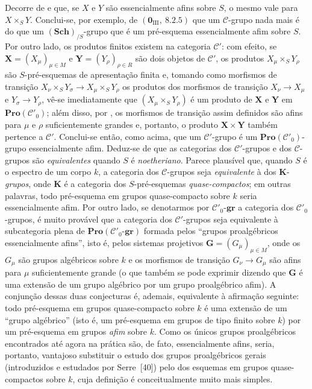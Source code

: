 \begin{remark}[8.13.6]
\label{IV.8.13.6}
Decorre de  e  que, se $X$ e $Y$ são essencialmente afins sobre $S$, o mesmo vale para $X\times_S Y$.
Conclui-se, por exemplo, de $(\mathbf{0}_{\text{III}},~8.2.5)$ que um $\mathcal{C}$-grupo nada mais é do que um $(\mathbf{Sch})_{/S}$-grupo que é um pré-esquema essencialmente afim sobre $S$.
Por outro lado, os produtos finitos existem na categoria $\mathcal{C}'$: com efeito, se $\mathbf{X}=(X_\mu)_{\mu\in M}$ e $\mathbf{Y}=(Y_\rho)_{\rho\in R}$ são dois objetos de $\mathcal{C}'$, os produtos $X_\mu\times_S Y_\rho$ são $S$-pré-esquemas de apresentação finita e, tomando como morfismos de transição $X_\nu\times_S Y_\sigma\to X_\mu\times_S Y_\rho$ os produtos dos morfismos de transição $X_\nu\to X_\mu$ e $Y_\sigma\to Y_\rho$, vê-se imediatamente que $(X_\mu\times_S Y_\rho)$ é um produto de $\mathbf{X}$ e $\mathbf{Y}$ em $\mathbf{Pro}(\mathcal{C}'_0)$; além disso, por , os morfismos de transição assim definidos são afins para $\mu$ e $\rho$ suficientemente grandes e, portanto, o produto $\mathbf{X}\times\mathbf{Y}$ também pertence a $\mathcal{C}'$.
Conclui-se então, como acima, que um $\mathcal{C}'$-grupo é um $\mathbf{Pro}(\mathcal{C}'_0)$-grupo essencialmente afim.
Deduz-se de  que as categorias dos $\mathcal{C}'$-grupos e dos $\mathcal{C}$-grupos são \emph{equivalentes} quando $S$ é \emph{noetheriano}.
Parece plausível que, quando $S$ é o espectro de um corpo $k$, a categoria dos $\mathcal{C}$-grupos seja \emph{equivalente} à dos $\boldsymbol{K}$-\emph{grupos}, onde $\boldsymbol{K}$ é a categoria dos $S$-pré-esquemas \emph{quase-compactos}; em outras palavras, todo pré-esquema em grupos quase-compacto sobre $k$ seria essencialmente afim.
Por outro lado, se denotarmos
por $\mathcal{C}'_0$-$\boldsymbol{gr}$ a categoria dos $\mathcal{C}'_0$-grupos, é muito provável que a categoria dos $\mathcal{C}'$-grupos seja equivalente à subcategoria plena de $\mathbf{Pro}(\mathcal{C}'_0\text{-}\boldsymbol{gr})$ formada pelos ``grupos proalgébricos essencialmente afins'', isto é, pelos sistemas projetivos $\mathbf{G}=(G_\mu)_{\mu\in M}$, onde os $G_\mu$ são grupos algébricos sobre $k$ e os morfismos de transição $G_\nu\to G_\mu$ são afins para $\mu$ suficientemente grande (o que também se pode exprimir dizendo que $\mathbf{G}$ é uma extensão de um grupo algébrico por um grupo proalgébrico afim).
A conjunção dessas duas conjecturas é, ademais, equivalente à afirmação seguinte: todo pré-esquema em grupos quase-compacto sobre $k$ é uma extensão de um ``grupo algébrico'' (isto é, um pré-esquema em grupos de tipo finito sobre $k$) por um pré-esquema em grupos \emph{afim} sobre $k$.
Como os únicos grupos proalgébricos encontrados até agora na prática são, de fato, essencialmente afins, seria, portanto, vantajoso substituir o estudo dos grupos proalgébricos gerais (introduzidos e estudados por Serre~[40]) pelo dos esquemas em grupos quase-compactos sobre $k$, cuja definição é conceitualmente muito mais simples.
\end{remark}

